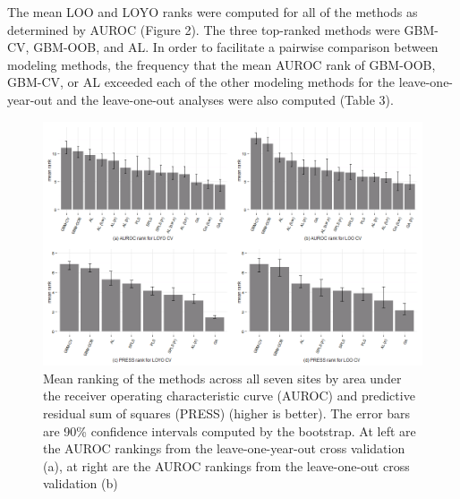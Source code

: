 The mean LOO and LOYO ranks were computed for all of the methods as
determined by AUROC (Figure 2). The three top-ranked methods were
GBM-CV, GBM-OOB, and AL. In order to facilitate a pairwise comparison
between modeling methods, the frequency that the mean AUROC rank of
GBM-OOB, GBM-CV, or AL exceeded each of the other modeling methods for
the leave-one-year-out and the leave-one-out analyses were also computed
(Table 3).

\begin{figure}[htbp]
\centering
\includegraphics{figure/auroc-barchart.png}
\caption{Mean ranking of the methods across all seven sites by area
under the receiver operating characteristic curve (AUROC) and predictive
residual sum of squares (PRESS) (higher is better). The error bars are
90\% confidence intervals computed by the bootstrap. At left are the
AUROC rankings from the leave-one-year-out cross validation (a), at
right are the AUROC rankings from the leave-one-out cross validation
(b)}
\end{figure}

